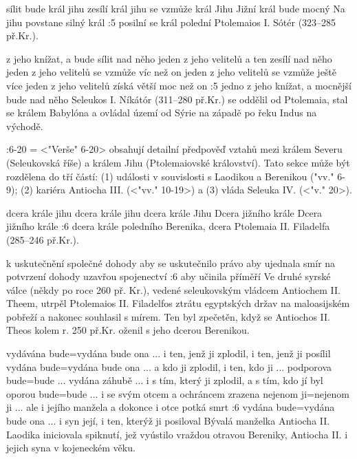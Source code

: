    {sílit bude král jihu}   %
    {zesílí král jihu}   %
    {se vzmůže král Jihu}   %
    {Jižní král bude mocný}   %
    {Na jihu povstane silný král}   %
:5 {posilní se král polední} Ptolemaios I. Sótér (323--285 př.Kr.).  
   
    {z jeho knížat, a bude sílit nad něho}   %
    {jeden z jeho velitelů a ten zesílí nad něho}   %
    {jeden z jeho velitelů se vzmůže víc než on}   %
    {jeden z jeho velitelů se vzmůže ještě více}   %
    {jeden z jeho velitelů získá větší moc než on}   %
:5 {jedno z jeho knížat, a mocnější bude nad něho} 
    Seleukos I. Níkátór (311--280 př.Kr.) se oddělil od Ptolemaia, stal se králem Babylóna a ovládal území od Sýrie na západě po řeku Indus na východě.
   
:6-20 {}={}  <"Verše" 6-20> obsahují detailní předpověď vztahů mezi  králem Severu (Seleukovská říše) a králem Jihu (Ptolemaiovské království). Tato sekce může být rozdělena do tří částí: (1) události v souvislosti s Laodikou a Berenikou ("vv." 6-9); (2) kariéra Antiocha III. (<"vv." 10-19>) a (3) vláda Seleuka IV. (<"v." 20>).


    {dcera krále jihu}   %
    {dcera krále jihu}   %
    {dcera krále Jihu}   %
    {Dcera jižního krále}   %
    {Dcera jižního krále}   %
:6 {dcera krále poledního}
    Berenika, dcera Ptolemaia II. Filadelfa (285--246 př.Kr.). 


    {k uskutečnění společné dohody}   %
    {aby se uskutečnilo právo}   %
    {aby ujednala smír}   %
    {na potvrzení dohody}   %
    {uzavřou spojenectví}   %
:6 {aby učinila příměří}
    Ve druhé syrské válce (někdy po roce 260 př. Kr.), vedené seleukovským vládcem Antiochem II. Theem, utrpěl Ptolemaios II. Filadelfos ztrátu egyptských držav na maloasijském pobřeží a nakonec souhlasil s mírem. Ten byl zpečetěn, když se Antiochos II. Theos kolem r. 250 př.Kr. oženil s jeho dcerou Berenikou.

    {vydávána bude}={vydána bude ona ... i ten, jenž ji zplodil, i ten, jenž ji posílil}   %
    {vydána bude}={vydána bude ona ... a kdo ji zplodil, i ten, kdo ji ... podporova}   %
    {bude}={bude ... vydána záhubě ... i s tím, který ji zplodil, a s tím, kdo jí byl oporou}   %
    {bude}={bude ... i se svým otcem a ochráncem zrazena}   %
    {nejenom ji}={nejenom ji ... ale i jejího manžela a dokonce i otce potká smrt}   %
:6 {vydána bude}={vydána bude ona ... i syn její, i ten, kterýž ji posiloval} 
    Bývalá manželka Antiocha II. Laodika iniciovala spiknutí, jež vyústilo vraždou otravou Bereniky, Antiocha II. i jejich syna v kojeneckém věku.



